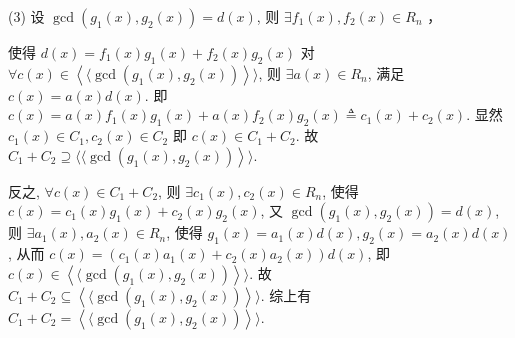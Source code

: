 \begin{solution}
(3) 设 $ \operatorname{gcd}\left(g_{1}(x), g_{2}(x)\right)=d(x) $, 则 $ \exists f_{1}(x), f_{2}(x) \in R_{n} $ ，

使得 $ d(x)=f_{1}(x) g_{1}(x)+f_{2}(x) g_{2}(x) $
对 $ \forall c(x) \in\left\langle\langle\operatorname{gcd}\left(g_{1}(x), g_{2}(x)\right)\right\rangle \rangle$,
则 $ \exists a(x) \in R_{n} $, 满足 $ c(x)=a(x) d(x) $.
即 $ c(x)=a(x) f_{1}(x) g_{1}(x)+a(x) f_{2}(x) g_{2}(x) \triangleq c_{1}(x)+c_{2}(x) $.
显然 $ c_{1}(x) \in C_{1}, c_{2}(x) \in C_{2} $ 即 $ c(x) \in C_{1}+C_{2} $.
故 $ \left.C_{1}+C_{2} \supseteq \langle\langle \operatorname{gcd}\left(g_{1}(x), g_{2}(x)\right)\right\rangle\rangle $.

反之, $ \forall c(x) \in C_{1}+C_{2} $, 则 $ \exists c_{1}(x), c_{2}(x) \in R_{n} $, 使得 $ c(x)=c_{1}(x) g_{1}(x)+c_{2}(x) g_{2}(x) $,
又 $ \operatorname{gcd}\left(g_{1}(x), g_{2}(x)\right)=d(x) $, 则 $ \exists a_{1}(x), a_{2}(x) \in R_{n} $,
使得 $ g_{1}(x)=a_{1}(x) d(x), g_{2}(x)=a_{2}(x) d(x) $,
从而 $ c(x)=\left(c_{1}(x) a_{1}(x)+c_{2}(x) a_{2}(x)\right) d(x) $,
即 $ c(x) \in\left\langle\langle\operatorname{gcd}\left(g_{1}(x), g_{2}(x)\right)\right\rangle\rangle $.
故 $ C_{1}+C_{2} \subseteq\left\langle\langle\operatorname{gcd}\left(g_{1}(x), g_{2}(x)\right)\right\rangle \rangle$.
综上有 $ C_{1}+C_{2}=\left\langle\langle\operatorname{gcd}\left(g_{1}(x), g_{2}(x)\right)\right\rangle\rangle $.
\end{solution}





